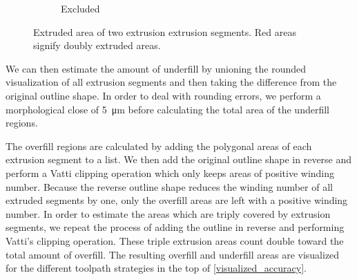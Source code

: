 \begin{figure}
\begin{subfigure}{\figwidth}
\caption{Excluded}
\end{subfigure}
\caption{
Extruded area of two extrusion extrusion segments.
Red areas signify doubly extruded areas.
}
\label{segment_visualization}
\end{figure}

We can then estimate the amount of underfill by unioning the rounded visualization of all extrusion segments and then taking the difference from the original outline shape.
In order to deal with rounding errors, we perform a morphological close of \SI{5}{\micro\meter} before calculating the total area of the underfill regions.

The overfill regions are calculated by adding the polygonal areas of each extrusion segment to a list.
We then add the original outline shape in reverse and perform a Vatti clipping operation \cite{Vatti2019clipping} which only keeps areas of positive winding number.
Because the reverse outline shape reduces the winding number of all extruded segments by one, only the overfill areas are left with a positive winding number.
In order to estimate the areas which are triply covered by extrusion segments, we repeat the process of adding the outline in reverse and performing Vatti's clipping operation.
These triple extrusion areas count double toward the total amount of overfill.
The resulting overfill and underfill areas are visualized for the different toolpath strategies in the top of \cref{visualized_accuracy}.


